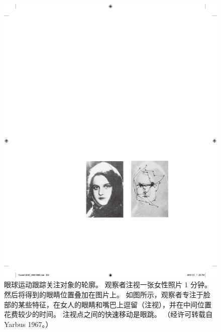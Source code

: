 \begin{figure}[htbp]
	\centering
	\includegraphics[width=0.4\linewidth]{chap35/fig_35_5}
	\caption{眼球运动跟踪关注对象的轮廓。 观察者注视一张女性照片 1 分钟。 然后将得到的眼睛位置叠加在图片上。 如图所示，观察者专注于脸部的某些特征，在女人的眼睛和嘴巴上逗留（注视），并在中间位置花费较少的时间。 注视点之间的快速移动是眼跳。 （经许可转载自 Yarbus 1967。）}
	\label{fig:35_5}
\end{figure}



